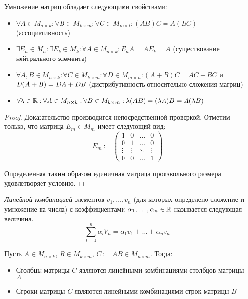 \begin{proposition}
	Умножение матриц обладает следующими свойствами:
	
	\begin{itemize}
		\item $\forall A \in M_{n \times k}: \forall B \in M_{k \times m}: \forall C \in M_{m \times l}: (AB)C = A(BC)$ (ассоциативность)
		\item $\exists E_n \in  M_{n}: \exists E_k \in M_{k}: \forall A \in M_{n \times k} : E_nA = AE_k = A$ (существование нейтрального элемента)
		\item $\forall A, B \in M_{n \times k}: \forall C \in M_{k \times m}: \forall D \in M_{m \times n}: (A+B)C = AC + BC$ и $D(A+B) \hm= DA + DB$ (дистрибутивность относительно сложения матриц)
		\item $\forall \lambda \in \mathbb{R}: \forall A \in M_{n \times k}: \forall B \in M_{k \times m}: \lambda (AB) = (\lambda A)B = A(\lambda B)$
	\end{itemize}
\end{proposition}

\begin{proof}
	Доказательство производится непосредственной проверкой. Отметим только, что матрица $E_m \in M_m$ имеет следующий вид:
	\[E_m := \begin{pmatrix}
	1 & 0 & \dots & 0\\
	0 & 1 & \dots & 0\\
	\vdots & \vdots & \ddots & \vdots\\
	0 & 0 & \dots & 1
	\end{pmatrix}\]
	
	Определенная таким образом единичная матрица произвольного размера удовлетворяет условию.
\end{proof}

\begin{definition}
	\textit{Линейной комбинацией} элементов $v_1, \dots, v_n$ (для которых определено сложение и умножение на числа) с коэффициентами $\alpha_1, \dots, \alpha_n \in \mathbb{R}$ называется следующая величина:
	\[\sum_{i = 1}^{n}\alpha_iV_n = \alpha_1v_1 + \dots + \alpha_nv_n\]
\end{definition}

\begin{proposition}
	Пусть $A \in M_{n \times k}$, $B \in M_{k \times m}$, $C := AB \in M_{n \times m}$. Тогда:
	\begin{itemize}
		\item Столбцы матрицы $C$ являются линейными комбинациями столбцов матрицы $A$
		\item Строки матрицы $C$ являются линейными комбинациями строк матрицы $B$
	\end{itemize}
\end{proposition}

